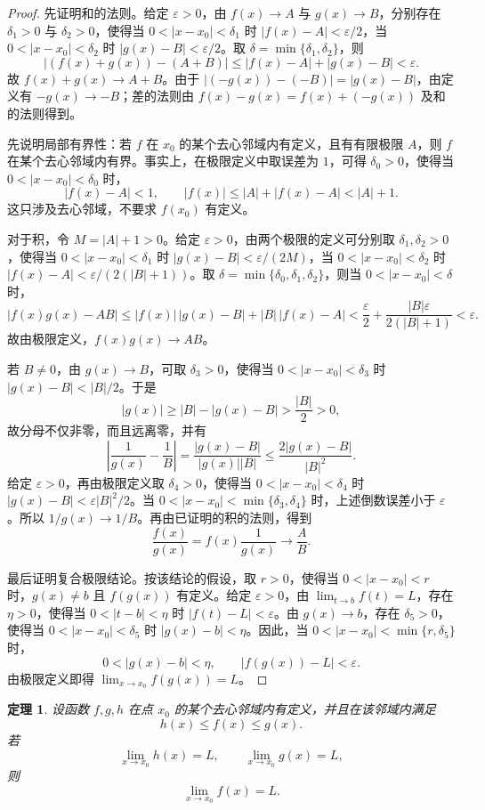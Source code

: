 \documentclass[UTF8,fontset=fandol,11pt]{ctexart}
\newtheorem{theorem}[definition]{定理}
\begin{document}
\begin{proof}
先证明和的法则。给定 $\varepsilon>0$，由 $f(x)\to A$ 与 $g(x)\to B$，分别存在 $\delta_1>0$ 与 $\delta_2>0$，使得当 $0<|x-x_0|<\delta_1$ 时 $|f(x)-A|<\varepsilon/2$，当 $0<|x-x_0|<\delta_2$ 时 $|g(x)-B|<\varepsilon/2$。取 $\delta=\min\{\delta_1,\delta_2\}$，则
\[
\left|(f(x)+g(x))-(A+B)\right|\leq |f(x)-A|+|g(x)-B|<\varepsilon.
\]
故 $f(x)+g(x)\to A+B$。由于 $|(-g(x))-(-B)|=|g(x)-B|$，由定义有 $-g(x)\to-B$；差的法则由 $f(x)-g(x)=f(x)+(-g(x))$ 及和的法则得到。

先说明局部有界性：若 $f$ 在 $x_0$ 的某个去心邻域内有定义，且有有限极限 $A$，则 $f$ 在某个去心邻域内有界。事实上，在极限定义中取误差为 $1$，可得 $\delta_0>0$，使得当 $0<|x-x_0|<\delta_0$ 时，
\[
|f(x)-A|<1,\qquad |f(x)|\leq |A|+|f(x)-A|<|A|+1.
\]
这只涉及去心邻域，不要求 $f(x_0)$ 有定义。

对于积，令 $M=|A|+1>0$。给定 $\varepsilon>0$，由两个极限的定义可分别取 $\delta_1,\delta_2>0$，使得当 $0<|x-x_0|<\delta_1$ 时 $|g(x)-B|<\varepsilon/(2M)$，当 $0<|x-x_0|<\delta_2$ 时 $|f(x)-A|<\varepsilon/(2(|B|+1))$。取 $\delta=\min\{\delta_0,\delta_1,\delta_2\}$，则当 $0<|x-x_0|<\delta$ 时，
\[
|f(x)g(x)-AB|\leq |f(x)|\,|g(x)-B|+|B|\,|f(x)-A|
<\frac{\varepsilon}{2}+\frac{|B|\varepsilon}{2(|B|+1)}<\varepsilon.
\]
故由极限定义，$f(x)g(x)\to AB$。

若 $B\neq0$，由 $g(x)\to B$，可取 $\delta_3>0$，使得当 $0<|x-x_0|<\delta_3$ 时 $|g(x)-B|<|B|/2$。于是
\[
|g(x)|\geq |B|-|g(x)-B|>\frac{|B|}{2}>0,
\]
故分母不仅非零，而且远离零，并有
\[
\left|\frac{1}{g(x)}-\frac{1}{B}\right|=\frac{|g(x)-B|}{|g(x)||B|}\leq\frac{2|g(x)-B|}{|B|^2}.
\]
给定 $\varepsilon>0$，再由极限定义取 $\delta_4>0$，使得当 $0<|x-x_0|<\delta_4$ 时 $|g(x)-B|<\varepsilon|B|^2/2$。当 $0<|x-x_0|<\min\{\delta_3,\delta_4\}$ 时，上述倒数误差小于 $\varepsilon$。所以 $1/g(x)\to1/B$。再由已证明的积的法则，得到
\[
\frac{f(x)}{g(x)}=f(x)\frac{1}{g(x)}\to\frac{A}{B}.
\]

最后证明复合极限结论。按该结论的假设，取 $r>0$，使得当 $0<|x-x_0|<r$ 时，$g(x)\neq b$ 且 $f(g(x))$ 有定义。给定 $\varepsilon>0$，由 $\lim_{t\to b}f(t)=L$，存在 $\eta>0$，使得当 $0<|t-b|<\eta$ 时 $|f(t)-L|<\varepsilon$。由 $g(x)\to b$，存在 $\delta_5>0$，使得当 $0<|x-x_0|<\delta_5$ 时 $|g(x)-b|<\eta$。因此，当 $0<|x-x_0|<\min\{r,\delta_5\}$ 时，
\[
0<|g(x)-b|<\eta,\qquad |f(g(x))-L|<\varepsilon.
\]
由极限定义即得 $\lim_{x\to x_0}f(g(x))=L$。
\end{proof}
\begin{theorem}
设函数 $f,g,h$ 在点 $x_0$ 的某个去心邻域内有定义，并且在该邻域内满足
\[
h(x)\leq f(x)\leq g(x).
\]
若
\[
\lim_{x\to x_0}h(x)=L,
\qquad
\lim_{x\to x_0}g(x)=L,
\]
则
\[
\lim_{x\to x_0}f(x)=L.
\]
\label{thm:squeeze-theorem}
\end{theorem}
\end{document}
